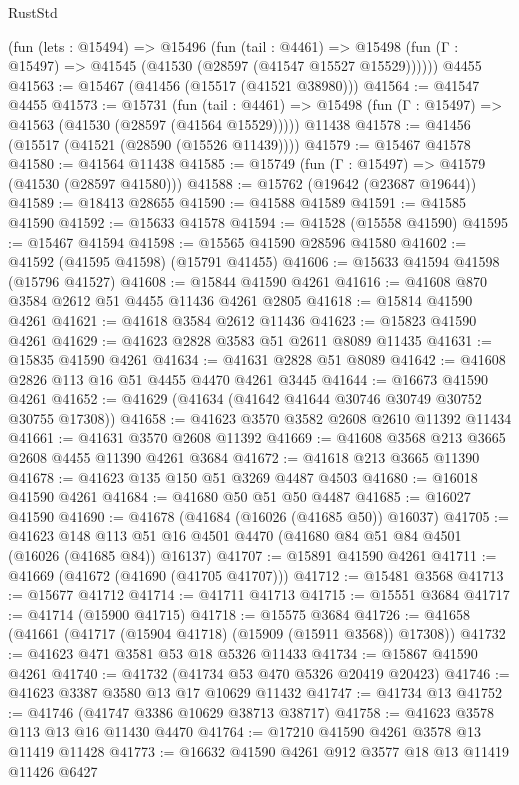 \begin{lexlean}{RustStd}
\begin{coremodule}
    (fun (lets : @15494) =>
    @15496
      (fun (tail : @4461) =>
      @15498 (fun (Γ : @15497) => @41545 (@41530 (@28597 (@41547 @15527 @15529))))))
    @4455
@41563 := @15467 (@41456 (@15517 (@41521 @38980)))
@41564 := @41547 @4455
@41573 := @15731
    (fun (tail : @4461) => @15498 (fun (Γ : @15497) => @41563 (@41530 (@28597 (@41564 @15529)))))
    @11438
@41578 := @41456 (@15517 (@41521 (@28590 (@15526 @11439))))
@41579 := @15467 @41578
@41580 := @41564 @11438
@41585 := @15749 (fun (Γ : @15497) => @41579 (@41530 (@28597 @41580)))
@41588 := @15762 (@19642 (@23687 @19644))
@41589 := @18413 @28655
@41590 := @41588 @41589
@41591 := @41585 @41590
@41592 := @15633 @41578
@41594 := @41528 (@15558 @41590)
@41595 := @15467 @41594
@41598 := @15565 @41590 @28596 @41580
@41602 := @41592 (@41595 @41598) (@15791 @41455)
@41606 := @15633 @41594 @41598 (@15796 @41527)
@41608 := @15844 @41590 @4261
@41616 := @41608 @870 @3584 @2612 @51 @4455 @11436 @4261 @2805
@41618 := @15814 @41590 @4261
@41621 := @41618 @3584 @2612 @11436
@41623 := @15823 @41590 @4261
@41629 := @41623 @2828 @3583 @51 @2611 @8089 @11435
@41631 := @15835 @41590 @4261
@41634 := @41631 @2828 @51 @8089
@41642 := @41608 @2826 @113 @16 @51 @4455 @4470 @4261 @3445
@41644 := @16673 @41590 @4261
@41652 := @41629 (@41634 (@41642 @41644 @30746 @30749 @30752 @30755 @17308))
@41658 := @41623 @3570 @3582 @2608 @2610 @11392 @11434
@41661 := @41631 @3570 @2608 @11392
@41669 := @41608 @3568 @213 @3665 @2608 @4455 @11390 @4261 @3684
@41672 := @41618 @213 @3665 @11390
@41678 := @41623 @135 @150 @51 @3269 @4487 @4503
@41680 := @16018 @41590 @4261
@41684 := @41680 @50 @51 @50 @4487
@41685 := @16027 @41590
@41690 := @41678 (@41684 (@16026 (@41685 @50)) @16037)
@41705 := @41623
    @148
    @113
    @51
    @16
    @4501
    @4470
    (@41680 @84 @51 @84 @4501 (@16026 (@41685 @84)) @16137)
@41707 := @15891 @41590 @4261
@41711 := @41669 (@41672 (@41690 (@41705 @41707)))
@41712 := @15481 @3568
@41713 := @15677 @41712
@41714 := @41711 @41713
@41715 := @15551 @3684
@41717 := @41714 (@15900 @41715)
@41718 := @15575 @3684
@41726 := @41658 (@41661 (@41717 (@15904 @41718) (@15909 (@15911 @3568)) @17308))
@41732 := @41623 @471 @3581 @53 @18 @5326 @11433
@41734 := @15867 @41590 @4261
@41740 := @41732 (@41734 @53 @470 @5326 @20419 @20423)
@41746 := @41623 @3387 @3580 @13 @17 @10629 @11432
@41747 := @41734 @13
@41752 := @41746 (@41747 @3386 @10629 @38713 @38717)
@41758 := @41623 @3578 @113 @13 @16 @11430 @4470
@41764 := @17210 @41590 @4261 @3578 @13 @11419 @11428
@41773 := @16632 @41590 @4261 @912 @3577 @18 @13 @11419 @11426 @6427

\end{coremodule}
\end{lexlean}
